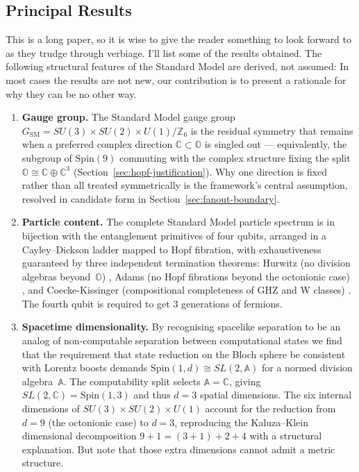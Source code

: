 \documentclass{article}
\theoremstyle{plain}
\theoremstyle{definition}
\theoremstyle{remark}\newtheorem*{remark}{Remark}
\begin{document}
\subsection{Principal Results}
This is a long paper, so it is wise to give the reader something to look forward to as they trudge through verbiage. I'll list some of the results obtained. The following structural features of the Standard Model are derived, not assumed: In most cases the results are not new, our contribution is to present a rationale for why they can be no other way.

\begin{enumerate}
  \item \textbf{Gauge group.} The Standard Model gauge group
$G_{\mathrm{SM}} = SU(3) \times SU(2) \times U(1)/\mathbb{Z}_6$ is the residual symmetry
that remains when a preferred complex direction $\mathbb{C} \subset \mathbb{O}$ is singled
out --- equivalently, the subgroup of $\mathrm{Spin}(9)$ commuting with the complex structure
fixing the split $\mathbb{O} \cong \mathbb{C} \oplus \mathbb{C}^3$ (Section~\ref{sec:hopf-justification}).
Why one direction is fixed rather than all treated symmetrically is the framework's central
assumption, resolved in candidate form in Section~\ref{sec:fanout-boundary}.

  \item \textbf{Particle content.} The complete Standard Model particle spectrum is in bijection with the entanglement primitives of four qubits, arranged in a Cayley--Dickson ladder mapped to Hopf fibration,  with exhaustiveness guaranteed by three independent termination theorems: Hurwitz (no division algebras beyond~$\mathbb{O}$) \autocite{hurwitz1898composition}, Adams (no Hopf fibrations beyond the octonionic case) \autocite{adams1960hopf}, and Coecke-Kissinger (compositional completeness of GHZ and W classes) \autocite{coeckekissinger2010compositional}. The fourth qubit is required to get 3 generations of fermions. 

  \item \textbf{Spacetime dimensionality.} By recognising spacelike separation to be an analog of non-computable separation between computational states we find that the requirement that state reduction on the Bloch sphere be consistent with Lorentz boosts demands $\mathrm{Spin}(1,d) \cong SL(2,\mathbb{A})$ for a normed division algebra~$\mathbb{A}$. The computability split selects $\mathbb{A} = \mathbb{C}$, giving $SL(2,\mathbb{C}) = \mathrm{Spin}(1,3)$ and thus $d = 3$ spatial dimensions. The six internal dimensions of $SU(3) \times SU(2) \times U(1)$ account for the reduction from $d = 9$ (the octonionic case) to $d = 3$, reproducing the Kaluza--Klein dimensional decomposition $9+1 = (3+1) + 2 + 4$ with a structural explanation. But note that those extra dimensions cannot admit a metric structure.



\end{enumerate}
\end{document}
